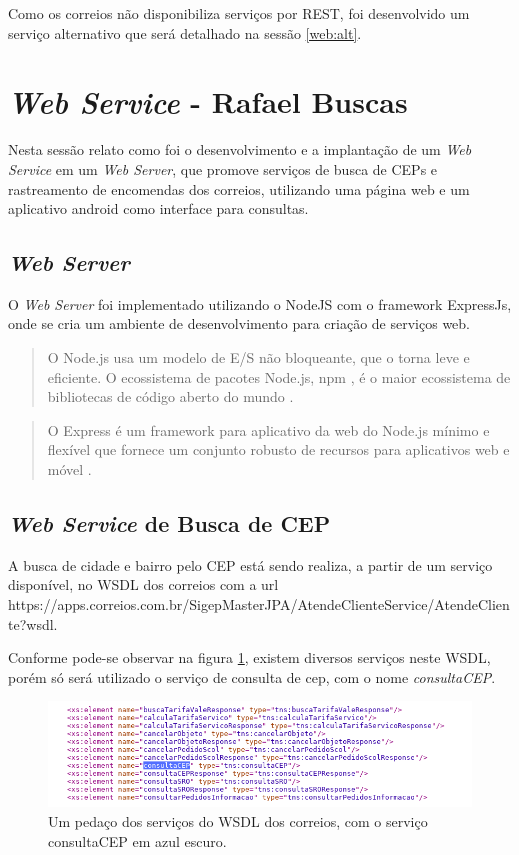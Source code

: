 \documentclass[12pt]{article}
\begin{document}
 Como os correios não disponibiliza serviços por REST, foi desenvolvido um serviço alternativo  que será detalhado na sessão \ref{web:alt}.  

\section{\textit{Web Service} - Rafael Buscas }
Nesta sessão relato como foi o desenvolvimento e a implantação de um \textit{Web Service} em um \textit{Web Server}, que promove serviços de busca de CEPs e rastreamento de encomendas dos correios, utilizando uma página web e um aplicativo android como interface para consultas.
 
\subsection{\textit{Web Server}}
	O \textit{Web Server} foi implementado utilizando o NodeJS com o framework ExpressJs, onde se cria um ambiente de desenvolvimento para criação de serviços web.
	\begin{quote}
	O Node.js usa um modelo de E/S não bloqueante, que o torna leve e eficiente. O ecossistema de pacotes Node.js, npm , é o maior ecossistema de bibliotecas de código aberto do mundo \cite{nodejs}.
	\end{quote}
	\begin{quote}
	O Express é um framework para aplicativo da web do Node.js mínimo e flexível que fornece um conjunto robusto de recursos para aplicativos web e móvel \cite{expressjs}.
	\end{quote}

\subsection{\textit{Web Service} de Busca de CEP}\label{web:cep}
	A busca de cidade e bairro pelo CEP está sendo realiza, a partir de um serviço disponível, no WSDL dos 
	correios com a url https://apps.correios.com.br/SigepMasterJPA/AtendeClienteService/AtendeCliente?wsdl.
	
	Conforme pode-se observar na figura \ref{c33}, existem diversos serviços neste WSDL, porém só será utilizado o serviço de consulta de cep, com o nome \textit{consultaCEP}.
	
	 \begin{figure}[H]
		\centering
		\includegraphics[scale=0.58]{Imagens/wsdlcep.png}
		\caption{Um pedaço dos serviços do WSDL dos correios, com o serviço consultaCEP em azul escuro.}
		\label{c33}
	\end{figure}
\end{document}
